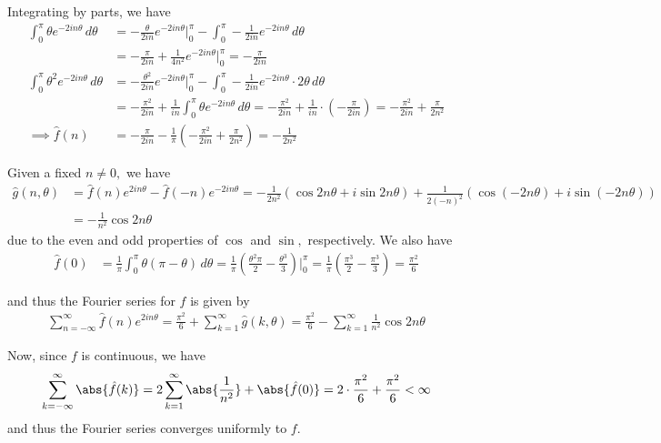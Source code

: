 \documentclass{article}
\begin{document}
\begin{enumerate}
\begin{enumerate}[(a)]
\begin{soln}
	  Integrating by parts, we have
	  \begin{align*}
	    \int_0^\pi \theta e^{-2in\theta}\, d\theta &= -\frac{\theta}{2in} e^{-2in\theta}\bigg\vert_0^\pi - \int_0^\pi -\frac{1}{2in} e^{-2in\theta}\, d\theta \\
	    &= -\frac{\pi}{2in} + \frac{1}{4n^2}e^{-2in\theta}\bigg\vert_0^\pi = -\frac{\pi}{2in} \\
	    \int_0^\pi \theta^2 e^{-2in\theta}\, d\theta &= -\frac{\theta^2}{2in}e^{-2in\theta}\bigg\vert_0^\pi - \int_0^\pi -\frac{1}{2in}e^{-2in\theta}\cdot 2\theta\, d\theta \\
	    &= -\frac{\pi^2}{2in} + \frac{1}{in}\int_0^\pi \theta e^{-2in\theta}\, d\theta = -\frac{\pi^2}{2in} + \frac{1}{in} \cdot \left( -\frac{\pi}{2in} \right) = -\frac{\pi^2}{2in} + \frac{\pi}{2n^2} \\
	    \implies \hat f(n) &= -\frac{\pi}{2in} - \frac{1}{\pi}\left( -\frac{\pi^2}{2in} + \frac{\pi}{2n^2} \right) = -\frac{1}{2n^2}
	  \end{align*}

	  Given a fixed $n\neq0,$ we have
	  \begin{align*}
	    \hat g(n, \theta) &= \hat f(n)e^{2in\theta} - \hat f(-n) e^{-2in\theta} = -\frac{1}{2n^2} \left( \cos 2n\theta + i\sin 2n\theta \right) + \frac{1}{2(-n)^2}\left( \cos(-2n\theta) + i\sin(-2n\theta) \right) \\
	    &= -\frac{1}{n^2}\cos2n\theta
	  \end{align*}
	  due to the even and odd properties of $\cos$ and $\sin,$ respectively. We also have
	  \begin{align*}
	    \hat f(0) &= \frac{1}{\pi}\int_0^\pi \theta(\pi-\theta)\, d\theta = \frac{1}{\pi}\left( \frac{\theta^2\pi}{2} - \frac{\theta^3}{3} \right)\bigg\vert_0^\pi = \frac{1}{\pi} \left( \frac{\pi^3}{2} - \frac{\pi^3}{3} \right) = \frac{\pi^2}{6}
	  \end{align*}

	  and thus the Fourier series for $f$ is given by
	  \begin{align*}
	    \sum_{n=-\infty}^{\infty} \hat f(n)e^{2in\theta} = \frac{\pi^2}{6} + \sum_{k=1}^{\infty} \hat g(k, \theta) = \frac{\pi^2}{6} - \sum_{k=1}^{\infty} \frac{1}{n^2}\cos 2n\theta
	  \end{align*}

	  Now, since $f$ is continuous, we have
	  \begin{align*}
	    \sum_{k=-\infty}^{\infty} \abs{\hat f(k)} = 2\sum_{k=1}^{\infty} \abs{\frac{1}{n^2}} + \abs{\hat f(0)} = 2\cdot\frac{\pi^2}{6}+\frac{\pi^2}{6} < \infty
	  \end{align*}
	  and thus the Fourier series converges uniformly to $f.$ 


\end{soln}
\end{enumerate}
\end{enumerate}
\end{document}
